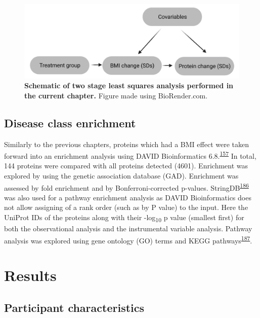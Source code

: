 \documentclass[11pt,twoside]{bristolthesis}
\begin{document}
\begin{figure}

{\centering \includegraphics{figure/DiRECT/DiRECT_analysis} 

}

\caption[Schematic of two stage least squares analysis performed using DiRECT data]{\textbf{Schematic of two stage least squares analysis performed in the current chapter.} Figure made using BioRender.com.}\label{fig:direct-tsls}
\end{figure}
\hypertarget{disease-class-enrichment}{%
\subsection{Disease class enrichment}\label{disease-class-enrichment}}

Similarly to the previous chapters, proteins which had a BMI effect were taken forward into an enrichment analysis using DAVID Bioinformatics 6.8.\textsuperscript{\protect\hyperlink{ref-Huang2009}{157}} In total, 144 proteins were compared with all proteins detected (4601). Enrichment was explored by using the genetic association database (GAD). Enrichment was assessed by fold enrichment and by Bonferroni-corrected p-values. StringDB\textsuperscript{\protect\hyperlink{ref-Szklarczyk2021}{186}} was also used for a pathway enrichment analysis as DAVID Bioinformatics does not allow assigning of a rank order (such as by P value) to the input. Here the UniProt IDs of the proteins along with their -log\textsubscript{10} p value (smallest first) for both the observational analysis and the instrumental variable analysis. Pathway analysis was explored using gene ontology (GO) terms and KEGG pathways\textsuperscript{\protect\hyperlink{ref-Kanehisa2016}{187}}.

\hypertarget{results-4}{%
\section{Results}\label{results-4}}

\hypertarget{participant-characteristics-2}{%
\subsection{Participant characteristics}\label{participant-characteristics-2}}
\end{document}

